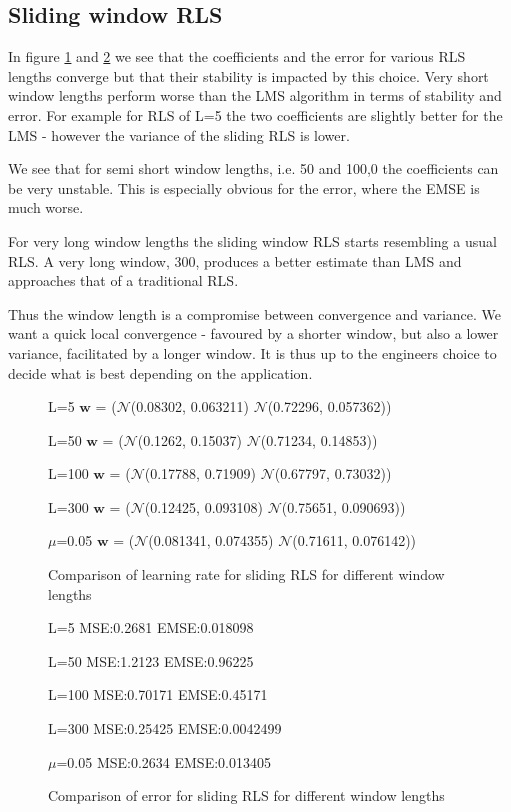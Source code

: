 \documentclass[10pt,twoside,a4paper]{report}
\begin{document}
\subsection{Sliding window RLS}
\FloatBarrier
In figure \ref{fig:3_2d} and \ref{fig:3_2d_e} we see that the coefficients and the error for various RLS lengths converge but that their stability is impacted by this choice. Very short window lengths perform worse than the LMS algorithm in terms of stability and error. For example for RLS of L=5 the two coefficients are slightly better for the LMS - however the variance of the sliding RLS is lower.

We see that for semi short window lengths, i.e. 50 and 100,0 the coefficients can be very unstable. This is especially obvious for the error, where the EMSE is much worse. 

For very long window lengths the sliding window RLS starts resembling a usual RLS. A very long window, 300, produces a better estimate than LMS and approaches that of a traditional RLS.

Thus the window length is a compromise between convergence and variance. We want a quick local convergence -  favoured by a shorter window, but also a lower variance, facilitated by a longer window. It is thus up to the engineers choice to decide what is best depending on the application.
\begin{figure}[h]
\centering
\resizebox{\textwidth}{!}{}
L=5 $\mathbf{w}$ = ($\mathcal{N}$(0.08302, 0.063211) $\mathcal{N}$(0.72296, 0.057362))

L=50 $\mathbf{w}$ = ($\mathcal{N}$(0.1262, 0.15037) $\mathcal{N}$(0.71234, 0.14853))

L=100 $\mathbf{w}$ = ($\mathcal{N}$(0.17788, 0.71909) $\mathcal{N}$(0.67797, 0.73032))

L=300 $\mathbf{w}$ = ($\mathcal{N}$(0.12425, 0.093108) $\mathcal{N}$(0.75651, 0.090693))

$\mu$=0.05 $\mathbf{w}$ = ($\mathcal{N}$(0.081341, 0.074355) $\mathcal{N}$(0.71611, 0.076142))
\caption{Comparison of learning rate for sliding RLS for different window lengths}
\label{fig:3_2d}
\end{figure}

\begin{figure}[h]
\centering
\resizebox{\textwidth}{!}{}
L=5 MSE:0.2681 EMSE:0.018098

L=50 MSE:1.2123 EMSE:0.96225

L=100 MSE:0.70171 EMSE:0.45171

L=300 MSE:0.25425 EMSE:0.0042499

$\mu$=0.05 MSE:0.2634 EMSE:0.013405

\caption{Comparison of error for sliding RLS for different window lengths}
\label{fig:3_2d_e}
\end{figure}
\end{document}
